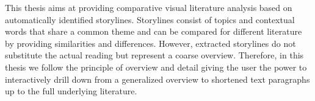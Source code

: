 
This thesis aims at providing comparative visual literature analysis based on automatically identified storylines. Storylines consist of topics and contextual words that share a common theme and can be compared for different literature by providing similarities and differences. However, extracted storylines do not substitute the actual reading but represent a coarse overview. Therefore, in this thesis we follow the principle of overview and detail giving the user the power to interactively drill down from a generalized overview to shortened text paragraphs up to the full underlying literature.  